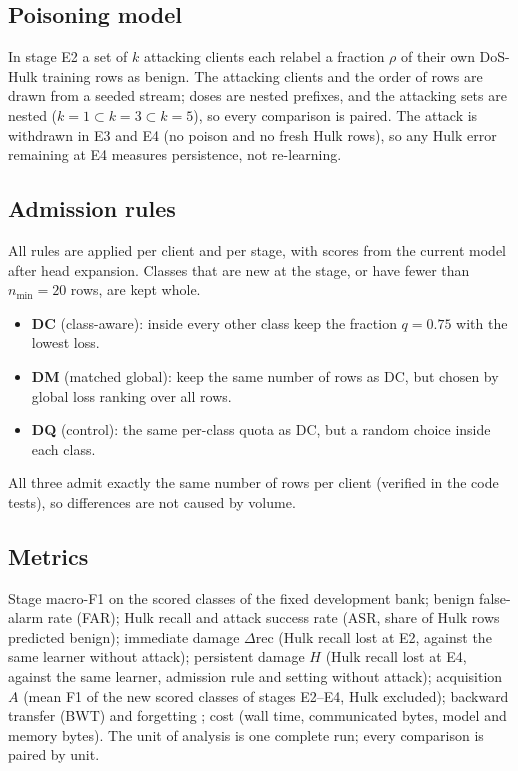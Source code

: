 \documentclass[10pt,a4paper]{article}
\begin{document}
\subsection{Poisoning model}
In stage E2 a set of $k$ attacking clients each relabel a fraction $\rho$ of their own DoS-Hulk training rows as benign. The attacking clients and the order of rows are drawn from a seeded stream; doses are nested prefixes, and the attacking sets are nested ($k{=}1\subset k{=}3\subset k{=}5$), so every comparison is paired. The attack is withdrawn in E3 and E4 (no poison and no fresh Hulk rows), so any Hulk error remaining at E4 measures persistence, not re-learning.

\subsection{Admission rules}
All rules are applied per client and per stage, with scores from the current model after head expansion. Classes that are new at the stage, or have fewer than $n_{\min}=20$ rows, are kept whole.
\begin{itemize}
\item \textbf{DC} (class-aware): inside every other class keep the fraction $q=0.75$ with the lowest loss.
\item \textbf{DM} (matched global): keep the same number of rows as DC, but chosen by global loss ranking over all rows.
\item \textbf{DQ} (control): the same per-class quota as DC, but a random choice inside each class.
\end{itemize}
All three admit exactly the same number of rows per client (verified in the code tests), so differences are not caused by volume.

\subsection{Metrics}
Stage macro-F1 on the scored classes of the fixed development bank; benign false-alarm rate (FAR); Hulk recall and attack success rate (ASR, share of Hulk rows predicted benign); immediate damage $\Delta$rec (Hulk recall lost at E2, against the same learner without attack); persistent damage $H$ (Hulk recall lost at E4, against the same learner, admission rule and setting without attack); acquisition $A$ (mean F1 of the new scored classes of stages E2--E4, Hulk excluded); backward transfer (BWT) and forgetting \cite{clmetrics}; cost (wall time, communicated bytes, model and memory bytes). The unit of analysis is one complete run; every comparison is paired by unit.
\end{document}
